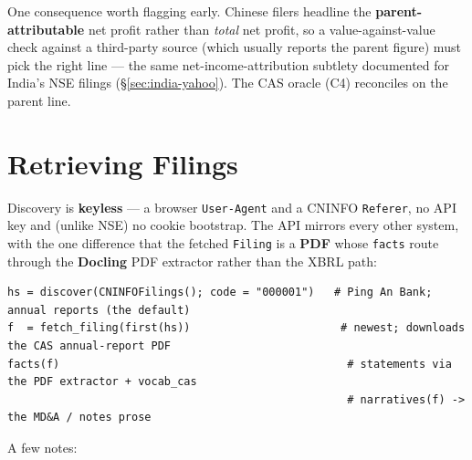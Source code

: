 \documentclass[11pt,a4paper]{report}
\begin{document}
\medskip\noindent One consequence worth flagging early. Chinese filers headline the \textbf{parent-attributable}
net profit rather than \emph{total} net profit, so a value-against-value
check against a third-party source (which usually reports the parent figure) must pick the right line --- the
same net-income-attribution subtlety documented for India's NSE filings (\S\ref{sec:india-yahoo}). The CAS
oracle (C4) reconciles on the parent line.

\section{Retrieving Filings}\label{sec:china-retrieve}

Discovery is \textbf{keyless} --- a browser \texttt{User-Agent} and a CNINFO \texttt{Referer}, no API key and
(unlike NSE) no cookie bootstrap. The API mirrors every other system, with the one difference that
the fetched \texttt{Filing} is a \textbf{PDF} whose \texttt{facts} route through the \textbf{Docling} PDF
extractor rather than the XBRL path:

\begin{lstlisting}
hs = discover(CNINFOFilings(); code = "000001")   # Ping An Bank; annual reports (the default)
f  = fetch_filing(first(hs))                       # newest; downloads the CAS annual-report PDF
facts(f)                                            # statements via the PDF extractor + vocab_cas
                                                    # narratives(f) -> the MD&A / notes prose
\end{lstlisting}

\noindent A few notes:
\end{document}
